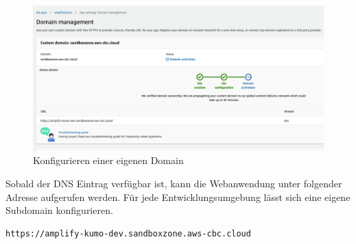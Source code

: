 \begin{figure}[htbp]
    \centering
    \includegraphics[width=1.0\textwidth]{50-Implementierung/SSL.png}
    \caption{Konfigurieren einer eigenen Domain}
    \label{fig:meine-grafik}
\end{figure}

Sobald der DNS Eintrag verfügbar ist, kann die Webanwendung unter folgender Adresse aufgerufen werden.
Für jede Entwicklungsumgebung lässt sich eine eigene Subdomain konfigurieren.
\\
\begin{lstlisting}[basicstyle=\ttfamily\small, breaklines=true , frame = single, backgroundcolor=\color{flashwhite} ]
https://amplify-kumo-dev.sandboxzone.aws-cbc.cloud
\end{lstlisting}
